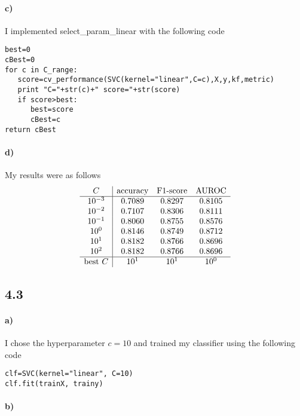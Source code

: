 \documentclass[12pt]{article}
\begin{document}
\paragraph{c)}

I implemented select\_param\_linear with the following code
\begin{verbatim}
best=0
cBest=0
for c in C_range:
   score=cv_performance(SVC(kernel="linear",C=c),X,y,kf,metric)
   print "C="+str(c)+" score="+str(score)
   if score>best:
      best=score
      cBest=c
return cBest
\end{verbatim}

\paragraph{d)}

My results were as follows
\[
        \begin{array}{c|c c c}
                C & \text{accuracy} & \text{F1-score} & \text{AUROC}\\
                \hline
                10^{-3} & 0.7089 & 0.8297 & 0.8105\\
                10^{-2} & 0.7107 & 0.8306 & 0.8111\\
                10^{-1} & 0.8060 & 0.8755 & 0.8576\\
                10^0 & 0.8146 & 0.8749 & 0.8712\\
                10^1 & 0.8182 & 0.8766 & 0.8696\\
                10^2 & 0.8182 & 0.8766 & 0.8696\\
                \hline
                \text{best } C & 10^1 & 10^1 & 10^0
        \end{array}
\]

\subsection*{4.3}

\paragraph{a)}

I chose the hyperparameter \(c=10\) and trained my classifier using the following code
\begin{verbatim}
clf=SVC(kernel="linear", C=10)
clf.fit(trainX, trainy)
\end{verbatim}

\paragraph{b)}
\end{document}

